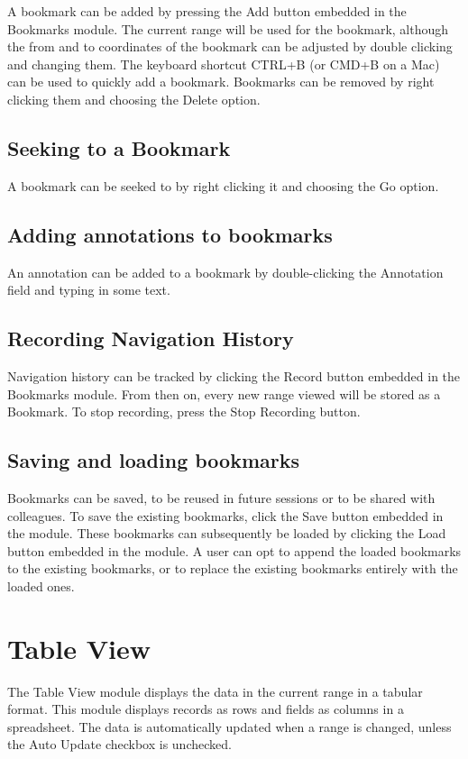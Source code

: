 \documentclass{report}
\begin{document}
A bookmark can be added by pressing the Add button embedded in the Bookmarks module. The current range will be used for the bookmark, although the from and to coordinates of the bookmark can be adjusted by double clicking and changing them. The keyboard shortcut CTRL+B (or CMD+B on a Mac) can be used to quickly add a bookmark. Bookmarks can be removed by right clicking them and choosing the Delete option.

\section{Seeking to a Bookmark}

A bookmark can be seeked to by right clicking it and choosing the Go option.

\section{Adding annotations to bookmarks}

An annotation can be added to a bookmark by double-clicking the Annotation field and typing in some text. 

\section{Recording Navigation History}

Navigation history can be tracked by clicking the Record button embedded in the Bookmarks module. From then on, every new range viewed will be stored as a Bookmark. To stop recording, press the Stop Recording button.

\section{Saving and loading bookmarks}

Bookmarks can be saved, to be reused in future sessions or to be shared with colleagues. To save the existing bookmarks, click the Save button embedded in the module. These bookmarks can subsequently be loaded by clicking the Load button embedded in the module. A user can opt to append the loaded bookmarks to the existing bookmarks, or to replace the existing bookmarks entirely with the loaded ones.

\chapter{Table View}

The Table View module displays the data in the current range in a tabular format. This module displays records as rows and fields as columns
in a spreadsheet. The data is automatically updated when a range is changed, unless the Auto Update checkbox is unchecked.
\end{document}
